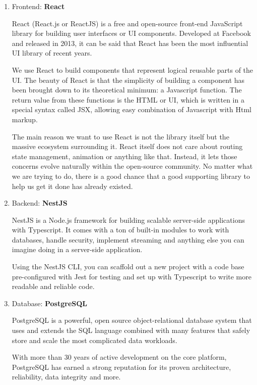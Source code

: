 \documentclass[a4paper]{article}
\numberwithin{equation}{section}
\begin{document}
\begin{enumerate}[label=\alph*.]

  \item Frontend: \textbf{React}

        React (React.js or ReactJS) is a free and open-source front-end JavaScript library for building user interfaces or UI components.
        Developed at Facebook and released in 2013, it can be said that React has been the most influential UI library of recent years.

        We use React to build components that represent logical reusable parts of the UI\@.
        The beauty of React is that the simplicity of building a component has been brought down to its theoretical minimum: a Javascript function.
        The return value from these functions is the HTML or UI, which is written in a special syntax called JSX, allowing easy combination of Javascript with Html markup.

        The main reason we want to use React is not the library itself but the massive ecosystem surrounding it.
        React itself does not care about routing state management, animation or anything like that.
        Instead, it lets those concerns evolve naturally within the open-source community.
        No matter what we are trying to do, there is a good chance that a good supporting library to help us get it done has already existed.

  \item Backend: \textbf{NestJS}

        NestJS is a Node.js framework for building scalable server-side applications with Typescript.
        It comes with a ton of built-in modules to work with databases, handle security, implement streaming and anything else you can imagine doing in a server-side application.

        Using the NestJS CLI, you can scaffold out a new project with a code base pre-configured with Jest for testing and set up with Typescript to write more readable and reliable code.

  \item Database: \textbf{PostgreSQL}

        PostgreSQL is a powerful, open source object-relational database system that uses and extends the SQL language combined with many features that safely store and scale the most complicated data workloads.

        With more than 30 years of active development on the core platform, PostgreSQL has earned a strong reputation for its proven architecture, reliability, data integrity and more.
\end{enumerate}
\end{document}
